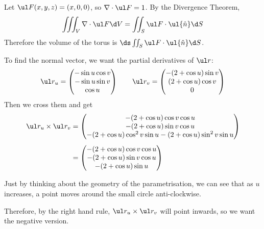 \documentclass[a4paper]{article}
\begin{document}
\clearpage
\subsection{~}

Let $\ul F(x, y, z) = (x, 0, 0)$, so $\nabla \cdot \ul F = 1$. By the Divergence Theorem, $$\iiint_V \nabla \cdot \ul F \d V = \iint_S \ul F \cdot \ul{\hat n} \d S$$
Therefore the volume of the torus is $\ds \iint_S \ul F \cdot \ul{\hat n} \d S$.

To find the normal vector, we want the partial derivatives of $\ul r$: $$
\ul r_u = \begin{pmatrix} -\sin u \cos v \\ -\sin u \sin v \\ \cos u \end{pmatrix} \qquad
\ul r_v = \begin{pmatrix} -(2 + \cos u) \sin v \\ (2 + \cos u) \cos v \\ 0 \end{pmatrix}
$$
Then we cross them and get \begin{align*}
\ul r_u \times \ul r_v &= \begin{pmatrix} -(2 + \cos u) \cos v \cos u \\ -(2 + \cos u) \sin v \cos u \\ -(2 + \cos u) \cos^2 v \sin u - (2 + \cos u) \sin^2 v \sin u \end{pmatrix}\\[1ex]
&= \begin{pmatrix} -(2 + \cos u) \cos v \cos u \\ -(2 + \cos u) \sin v \cos u \\ -(2 + \cos u) \sin u \end{pmatrix}
\end{align*}

Just by thinking about the geometry of the parametrisation, we can see that as $u$ increases, a point moves around the small circle anti-clockwise.

Therefore, by the right hand rule, $\ul r_u \times \ul r_v$ will point inwards, so we want the negative version.
\end{document}
